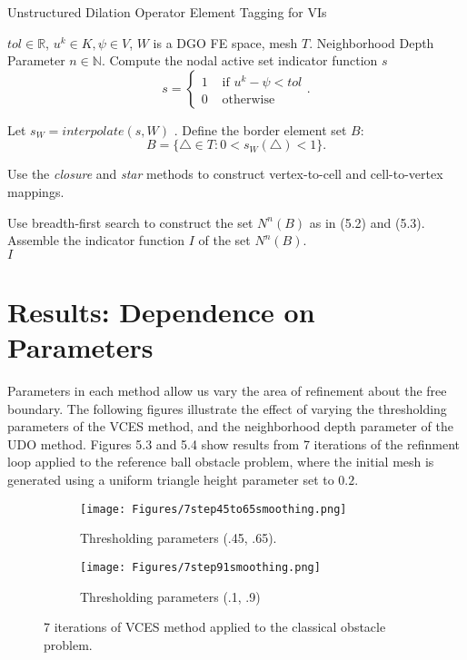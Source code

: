 \documentclass[12 pt]{report}
\begin{document}
\begin{algorithm}[H]
  \caption{Unstructured Dilation Operator Element Tagging for VIs}
  \begin{algorithmic}[1]
    \Require $tol \in \mathbb{R}$, $u^k \in K, \psi \in V$, $W$ is a DGO FE space, mesh $T$.
    \Require Neighborhood Depth Parameter $n \in \mathbb{N}$.
    \State Compute the nodal active set indicator function $s$
    \begin{equation}
    s = \begin{cases}
      1 & \text{ if } u^k - \psi < tol\\
      0 & \text{ otherwise}
    \end{cases}.
    \end{equation}
  
    \State Let $s_W = interpolate(s, W)$ .
    \State Define the border element set $B$:
    \begin{equation}
    B = \{\triangle \in T: 0 < s_W(\triangle) < 1 \} .
    \end{equation}

    \State Use the \emph{closure} and \emph{star} methods to construct vertex-to-cell and cell-to-vertex mappings.

    \State Use breadth-first search to construct the set $N^n(B)$ as in (5.2) and (5.3). 
    \State Assemble the indicator function $I$ of the set $N^n(B)$. \\
    \Return $I$
  \end{algorithmic}
  \end{algorithm}

\section{Results: Dependence on Parameters}

Parameters in each method allow us vary the area of refinement about the free boundary. The following figures illustrate the effect of varying the thresholding parameters of the VCES method, and the neighborhood depth parameter of the UDO method. Figures 5.3 and 5.4 show results from 7 iterations of the refinment loop applied to the reference ball obstacle problem, where the initial mesh is generated using a uniform triangle height parameter set to $0.2$. 
\begin{figure}[H]
  \centering
  \begin{subfigure}[b]{0.45\textwidth}
      \centering
      \texttt{[image: Figures/7step45to65smoothing.png]}
      \caption{Thresholding parameters (.45, .65).}
      \label{fig:image1}
  \end{subfigure}
  \hfill
  \begin{subfigure}[b]{0.45\textwidth}
      \centering
      \texttt{[image: Figures/7step91smoothing.png]}
      \caption{Thresholding parameters (.1, .9)}
      \label{fig:image2}
  \end{subfigure}
  \vspace*{.25cm}
  \caption{7 iterations of VCES method applied to the classical obstacle problem.}
  \label{fig:two_images}
\end{figure}
\end{document}
